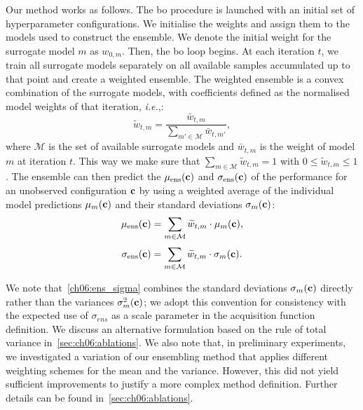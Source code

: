 Our method works as follows.
The \gls{bo} procedure is launched with an initial set of hyperparameter configurations. We initialise the weights and assign them to the models used to construct the ensemble. We denote the initial weight for the surrogate model $m$ as $w_{0,m}$.
Then, the \gls{bo} loop begins. At each iteration $t$, we train all surrogate models separately on all available samples accumulated up to that point and create a weighted ensemble. The weighted ensemble is a convex combination of the surrogate models, with coefficients defined as the normalised model weights of that iteration, \emph{i.e.},:
\begin{equation}
    \widetilde{w}_{t,m} = \frac{\bar{w}_{t,m}}{\sum_{m\prime\in\mathcal M}{\bar{w}_{t,m\prime}}},
\end{equation}
where $\mathcal M$ is the set of available surrogate models and $\bar{w}_{t,m}$ is the weight of model $m$ at iteration $t$. This way we make sure that $\sum_{m\in \mathcal M} \widetilde{w}_{t,m} = 1$ with $0\leq \widetilde{w}_{t,m} \leq 1$.
The ensemble can then predict the $\mu_{\text{ens}}(\mathbf{c})$ and $\sigma_{\text{ens}}(\mathbf{c})$ of the performance for an unobserved configuration $\mathbf{c}$ by using a weighted average
of the individual model predictions $\mu_m(\mathbf{c})$ and their standard deviations $\sigma_m(\mathbf{c})$:
\begin{equation}
    \mu_{\text{ens}}(\mathbf{c})= \sum_{m\in \mathcal M} \widetilde{w}_{t,m} \cdot \mu_{m}(\mathbf{c}),
    \label{ch06:ens_mu}
\end{equation}
\begin{equation}
    \sigma_{\text{ens}}(\mathbf{c})= \sum_{m\in \mathcal M} \widetilde{w}_{t,m} \cdot \sigma_{m}(\mathbf{c}).
    \label{ch06:ens_sigma}
\end{equation}

We note that~\cref{ch06:ens_sigma} combines the standard deviations $\sigma_{m}(\mathbf{c})$ directly rather than the variances $\sigma_{m}^{2}(\mathbf{c})$; we adopt this convention for consistency with the expected use of $\sigma_{ens}$ as a scale parameter in the acquisition function definition.
We discuss an alternative formulation based on the rule of total variance in~\cref{sec:ch06:ablations}.
We also note that, in preliminary experiments, we investigated a variation of our ensembling method that applies different weighting schemes for the mean and the variance. However, this did not yield sufficient improvements to justify a more complex method definition. Further details can be found in~\cref{sec:ch06:ablations}.


